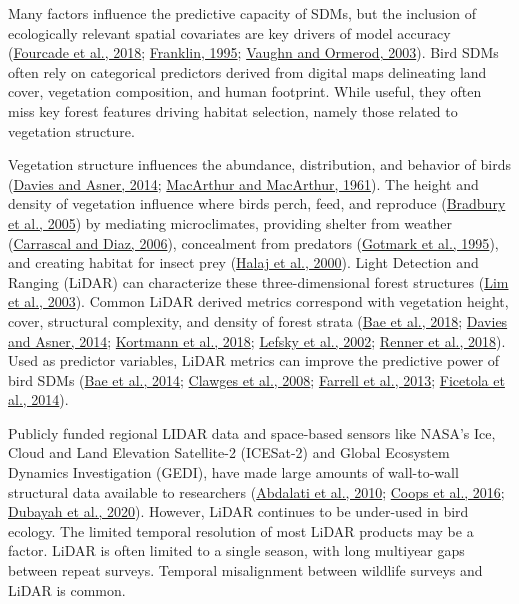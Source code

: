 \documentclass[
  12pt,
]{article}
\begin{document}
Many factors influence the predictive capacity of SDMs, but the inclusion of ecologically relevant spatial covariates are key drivers of model accuracy (\protect\hyperlink{ref-fourcadePaintingsPredictDistribution2018}{Fourcade et al., 2018}; \protect\hyperlink{ref-Franklin1995}{Franklin, 1995}; \protect\hyperlink{ref-Vaughn2003}{Vaughn and Ormerod, 2003}). Bird SDMs often rely on categorical predictors derived from digital maps delineating land cover, vegetation composition, and human footprint. While useful, they often miss key forest features driving habitat selection, namely those related to vegetation structure.

Vegetation structure influences the abundance, distribution, and behavior of birds (\protect\hyperlink{ref-Davies2014a}{Davies and Asner, 2014}; \protect\hyperlink{ref-MacArthurMacArthur1961}{MacArthur and MacArthur, 1961}). The height and density of vegetation influence where birds perch, feed, and reproduce (\protect\hyperlink{ref-Bradbury2005}{Bradbury et al., 2005}) by mediating microclimates, providing shelter from weather (\protect\hyperlink{ref-CarrascalDiaz2006}{Carrascal and Diaz, 2006}), concealment from predators (\protect\hyperlink{ref-GotmarkBlomqvist1995}{Gotmark et al., 1995}), and creating habitat for insect prey (\protect\hyperlink{ref-halajImportanceHabitatStructure2000}{Halaj et al., 2000}). Light Detection and Ranging (LiDAR) can characterize these three-dimensional forest structures (\protect\hyperlink{ref-limLiDARRemoteSensing2003}{Lim et al., 2003}). Common LiDAR derived metrics correspond with vegetation height, cover, structural complexity, and density of forest strata (\protect\hyperlink{ref-Bae2018}{Bae et al., 2018}; \protect\hyperlink{ref-Davies2014a}{Davies and Asner, 2014}; \protect\hyperlink{ref-Kortmann2018}{Kortmann et al., 2018}; \protect\hyperlink{ref-Lefsky2002}{Lefsky et al., 2002}; \protect\hyperlink{ref-Renner2018}{Renner et al., 2018}). Used as predictor variables, LiDAR metrics can improve the predictive power of bird SDMs (\protect\hyperlink{ref-Bae2014}{Bae et al., 2014}; \protect\hyperlink{ref-clawgesUseAirborneLidar2008}{Clawges et al., 2008}; \protect\hyperlink{ref-farrellUsingLiDARderivedVegetation2013b}{Farrell et al., 2013}; \protect\hyperlink{ref-ficetolaHowManyPredictors2014}{Ficetola et al., 2014}).

Publicly funded regional LIDAR data and space-based sensors like NASA's Ice, Cloud and Land Elevation Satellite-2 (ICESat-2) and Global Ecosystem Dynamics Investigation (GEDI), have made large amounts of wall-to-wall structural data available to researchers (\protect\hyperlink{ref-abdalatiICESat2LaserAltimetry2010}{Abdalati et al., 2010}; \protect\hyperlink{ref-coopsForestStructureHabitat2016}{Coops et al., 2016}; \protect\hyperlink{ref-dubayahGlobalEcosystemDynamics2020a}{Dubayah et al., 2020}). However, LiDAR continues to be under-used in bird ecology. The limited temporal resolution of most LiDAR products may be a factor. LiDAR is often limited to a single season, with long multiyear gaps between repeat surveys. Temporal misalignment between wildlife surveys and LiDAR is common.
\end{document}
